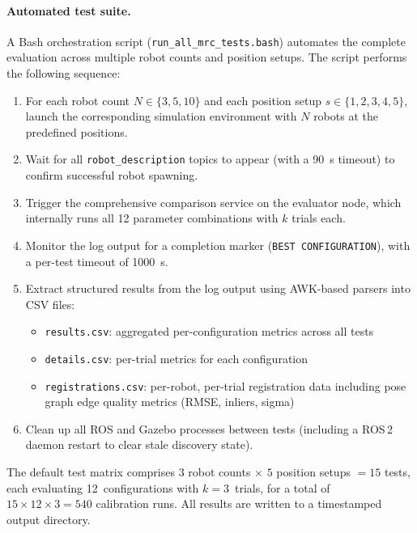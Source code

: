 \paragraph{Automated test suite.}
A Bash orchestration script (\texttt{run\_all\_mrc\_tests.bash})
automates the complete evaluation across multiple robot counts and
position setups.
The script performs the following sequence:
\begin{enumerate}
    \item For each robot count $N \in \{3, 5, 10\}$ and each position
          setup $s \in \{1, 2, 3, 4, 5\}$, launch the corresponding
          simulation environment with $N$ robots at the predefined
          positions.
    \item Wait for all \texttt{robot\_description} topics to appear
          (with a \SI{90}{\second} timeout) to confirm successful
          robot spawning.
    \item Trigger the comprehensive comparison service on the evaluator
          node, which internally runs all 12 parameter combinations
          with $k$ trials each.
    \item Monitor the log output for a completion marker
          (\texttt{BEST CONFIGURATION}), with a per-test timeout
          of \SI{1000}{\second}.
    \item Extract structured results from the log output using
          AWK-based parsers into CSV files:
          \begin{itemize}
              \item \texttt{results.csv}: aggregated per-configuration
                    metrics across all tests
              \item \texttt{details.csv}: per-trial metrics for each
                    configuration
              \item \texttt{registrations.csv}: per-robot, per-trial
                    registration data including pose graph edge quality
                    metrics (RMSE, inliers, sigma)
          \end{itemize}
    \item Clean up all ROS and Gazebo processes between tests
          (including a ROS\,2 daemon restart to clear stale
          discovery state).
\end{enumerate}

The default test matrix comprises $3$ robot counts $\times$
$5$ position setups $= 15$ tests, each evaluating 12~configurations
with $k = 3$~trials, for a total of $15 \times 12 \times 3 = 540$
calibration runs.
All results are written to a timestamped output directory.

